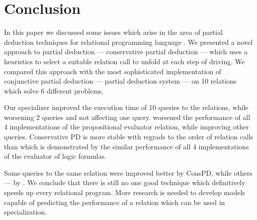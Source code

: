 \section{Conclusion}

In this paper we discussed some issues which arise in the area of partial deduction techniques for relational programming language \mk.
We presented a novel approach to partial deduction --- conservative partial deduction --- which uses a heuristics to select a suitable relation call to unfold at each step of driving.
We compared this approach with the most sophisticated implementation of conjunctive partial deduction --- \ecce partial deduction system --- on 10 relations which solve 6 different problems.

Our specializer improved the execution time of 10 queries to the  relations, while worsening 2 queries and not affecting one query.
\ecce worsened the performance of all 4 implementations of the propositional evaluator relation, while improving other queries.
Conservative PD is more stable with regrads to the order of relation calls than \ecce which is demonstrated by the similar performance of all 4 implementations of the evaluator of logic formulas.

Some queries to the same relation were improved better by ConsPD, while others --- by \ecce.
We conclude that there is still no one good technique which definitively speeds up every relational program.
More research is needed to develop models capable of predicting the performance of a relation which can be used in specialization.
